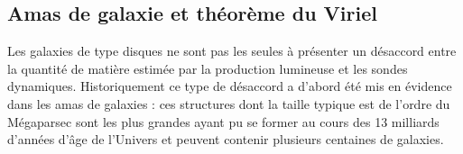 \subsection{Amas de galaxie et théorème du Viriel}

Les galaxies de type disques ne sont pas les seules à présenter un désaccord entre la quantité de matière estimée par la production lumineuse et les sondes dynamiques. Historiquement ce type de désaccord a d'abord été mis en évidence dans les amas de galaxies : ces structures dont la taille typique est de l'ordre du Mégaparsec sont les plus grandes ayant pu se former au cours des 13 milliards d'années d'âge de l'Univers et peuvent contenir plusieurs centaines de galaxies.

